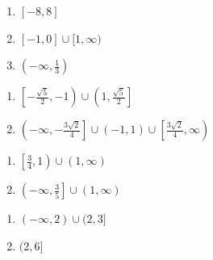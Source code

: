 \begin{multicols}{3}
\begin{enumerate}
\setcounter{enumi}{\value{HW}}

\item  $[-8,8]$    
\item  $[-1, 0] \cup [1, \infty)$  
\item $\left(-\infty, \frac{1}{3} \right)$

\setcounter{HW}{\value{enumi}}
\end{enumerate}
\end{multicols}

\begin{multicols}{2}
\begin{enumerate}
\setcounter{enumi}{\value{HW}}

\item $\left[ -\frac{\sqrt{5}}{2}, -1\right) \cup \left(1, \frac{\sqrt{5}}{2}\right]$
\item  $\left(-\infty, -\frac{3\sqrt{2}}{4} \right] \cup (-1,1) \cup \left[ \frac{3\sqrt{2}}{4}, \infty \right)$

\setcounter{HW}{\value{enumi}}
\end{enumerate}
\end{multicols}

\begin{multicols}{2}
\begin{enumerate}
\setcounter{enumi}{\value{HW}}


\item   $\left[ \frac{3}{4}, 1\right) \cup (1, \infty)$

\item $\left( -\infty, \frac{3}{5} \right] \cup (1, \infty)$

\setcounter{HW}{\value{enumi}}
\end{enumerate}
\end{multicols}

\begin{multicols}{2}
\begin{enumerate}
\setcounter{enumi}{\value{HW}}

\item  $(-\infty, 2) \cup (2,3]$
\item  $(2,6]$

\setcounter{HW}{\value{enumi}}
\end{enumerate}
\end{multicols}

